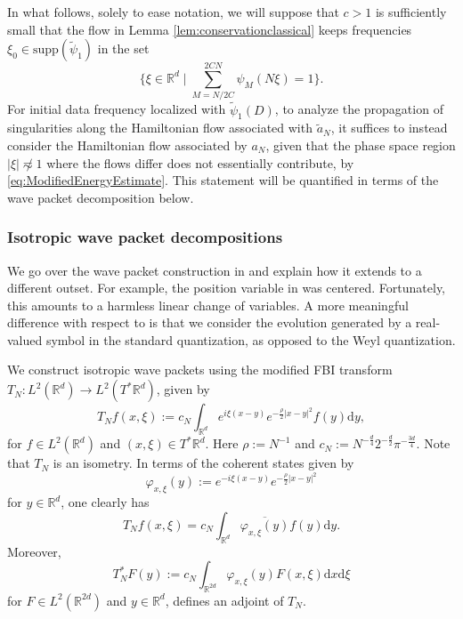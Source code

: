 \documentclass{amsart}
\numberwithin{equation}{section}
\theoremstyle{definition}
\newcommand{\R}{\mathbb{R}}
\newcommand{\Rd}{\mathbb{R}^{d}}
\newcommand {\ud}{\mathrm{d}}
\newcommand {\ph}{\varphi}
\newcommand {\Tp}{T^{*}\Rd}
\begin{document}
In what follows, solely to ease notation, we will suppose that $c>1$ is sufficiently small that  
the flow in Lemma \ref{lem:conservationclassical} keeps frequencies $\xi_0 \in \text{supp}(\tilde{\psi}_1)$ in the set
\begin{equation*}
\{ \xi \in \R^d \mid \sum_{M=N/2C}^{2CN} \psi_{M}(N\xi)  = 1 \}.
\end{equation*}
For initial data frequency localized with $\tilde{\psi}_1(D)$, to analyze the propagation of singularities along the Hamiltonian flow associated with $\tilde{a}_N$, it suffices to instead consider the Hamiltonian flow associated by $a_N$, given that the phase space region $|\xi| \not\eqsim 1$ where the flows differ does not essentially contribute, by \eqref{eq:ModifiedEnergyEstimate}. This statement will be quantified in terms of the wave packet decomposition below.


\subsubsection{Isotropic wave packet decompositions}

We go over the wave packet construction in \cite{SchippaTataru2025} and explain how it extends to a different outset. For example, the position variable in \cite{SchippaTataru2025} was centered. Fortunately, this amounts to a harmless linear change of variables. A more meaningful difference with respect to \cite{SchippaTataru2025} is that we consider the evolution generated by a real-valued symbol in the standard quantization, as opposed to the Weyl quantization.

We construct isotropic wave packets using the modified FBI transform $T_N:L^2(\R^d) \to L^2(T^* \R^d)$, given by
\begin{equation*}
T_N f(x,\xi) := c_N \int_{\Rd} e^{i \xi (x-y)} e^{-\frac{\rho}{2}|x-y|^2} f(y) \ud y,
\end{equation*}
for $f \in L^2(\R^d)$ and $(x,\xi) \in \Tp$. Here $\rho:= N^{-1}$ and $c_N := N^{-\frac{d}{4}} 2^{-\frac{d}{2}} \pi^{-\frac{3d}{4}}$. Note that $T_{N}$ is an isometry. In terms of the coherent states given by
\begin{equation*}
\ph_{x,\xi}(y):= e^{-i \xi (x-y)} e^{-\frac{\rho}{2} |x-y|^2}
\end{equation*}
for $y\in\Rd$, one clearly has
\begin{equation*}
T_N f(x,\xi) = c_N \int_{\R^d} \overline{\ph_{x,\xi}(y)} f(y) \ud y. 
\end{equation*}
Moreover, 
\[
T_{N}^{*}F(y):=c_{N}\int_{\R^{2d}}\ph_{x,\xi}(y)F(x,\xi)\ud x\ud\xi
\]
for $F\in L^{2}(\R^{2d})$ and $y\in\Rd$, defines an adjoint of $T_{N}$. 
\end{document}
